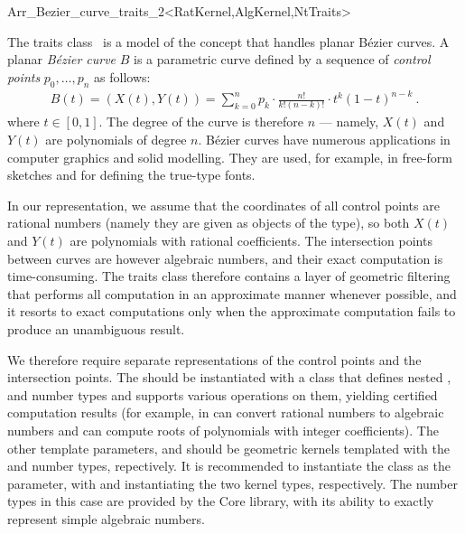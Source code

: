 
\ccRefPageBegin
\begin{ccRefClass}{Arr_Bezier_curve_traits_2<RatKernel,AlgKernel,NtTraits>}

\ccDefinition

The traits class \ccRefName\ is a model of the 
concept that handles planar B\'ezier curves. A planar {\em B\'ezier curve}
$B$ is a parametric curve defined by a sequence of {\em control points}
$p_0, \ldots, p_n$ as follows:
\begin{eqnarray*}
B(t) = \left(X(t), Y(t)\right)
  = \sum_{k=0}^{n}{p_k \cdot \frac{n!}{k! (n-k)!} \cdot
                   t^k (1-t)^{n-k}}\ .
\end{eqnarray*}
where $t \in [0, 1]$. The degree of the curve is therefore $n$ ---
namely, $X(t)$ and $Y(t)$ are polynomials of degree $n$. B\'ezier curves
have numerous applications in computer graphics and solid modelling. They
are used, for example, in free-form sketches and for defining the true-type
fonts.

In our representation, we assume that the coordinates of all control
points are rational numbers (namely they are given as objects of the
 type), so both $X(t)$ and $Y(t)$ are polynomials
with rational coefficients. The intersection points between curves are
however algebraic numbers, and their exact computation is time-consuming.
The traits class therefore contains a layer of geometric filtering that
performs all computation in an approximate manner whenever possible, and
it resorts to exact computations only when the approximate computation
fails to produce an unambiguous result.

We therefore require separate representations of the control points and
the intersection points. The  should be instantiated with a class
that defines nested ,  and  number
types and supports various operations on them, yielding certified computation
results (for example, in can convert rational numbers to algebraic numbers
and can compute roots of polynomials with integer coefficients).
The other template parameters,  and  should be
geometric kernels templated with the  and
 number types, repectively. It is recommended to
instantiate the  class as the 
parameter, with  and
 instantiating the two kernel types,
respectively. The number types in this case are provided by the {\sc Core}
library, with its ability to exactly represent simple algebraic numbers.


\end{ccRefClass}
